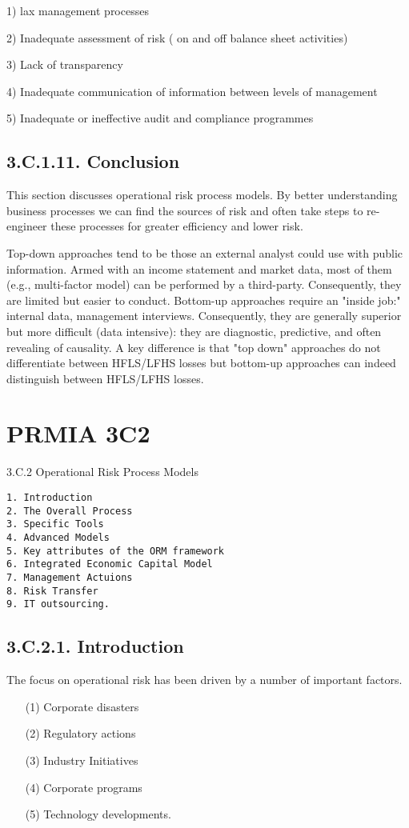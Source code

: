 \documentclass[12pt]{article}
\begin{document}
1) lax management processes

2) Inadequate assessment of risk ( on and off balance sheet activities)

3) Lack of transparency

4) Inadequate communication of information between levels of management

5) Inadequate or ineffective audit and compliance programmes

\subsection*{3.C.1.11. Conclusion}


This section discusses operational risk process models. By better understanding business processes we can find
the sources of risk and often take steps to re-engineer these processes for greater efficiency and lower risk.




Top-down approaches tend to be those an external analyst could use with public information. Armed with an income statement and market data, most of them (e.g., multi-factor model) can be performed by a third-party. Consequently, they are limited but easier to conduct.
Bottom-up approaches require an "inside job:" internal data, management interviews. Consequently, they are generally superior but more difficult (data intensive): they are diagnostic, predictive, and often revealing of causality. A key difference is that "top down" approaches do not differentiate between HFLS/LFHS losses but bottom-up approaches can indeed distinguish between HFLS/LFHS losses.


\newpage
\section{PRMIA 3C2}


 
3.C.2 Operational Risk Process Models
\begin{verbatim}
1. Introduction
2. The Overall Process
3. Specific Tools
4. Advanced Models
5. Key attributes of the ORM framework
6. Integrated Economic Capital Model
7. Management Actuions
8. Risk Transfer
9. IT outsourcing.
\end{verbatim}


 
 
\subsection*{3.C.2.1. Introduction}
The focus on operational risk has been driven by a number of important factors.
\begin{itemize}
\item[(1)] Corporate disasters
\item[(2)] Regulatory actions
\item[(3)] Industry Initiatives
\item[(4)] Corporate programs
\item[(5)] Technology developments.
\end{itemize} 
\end{document}
